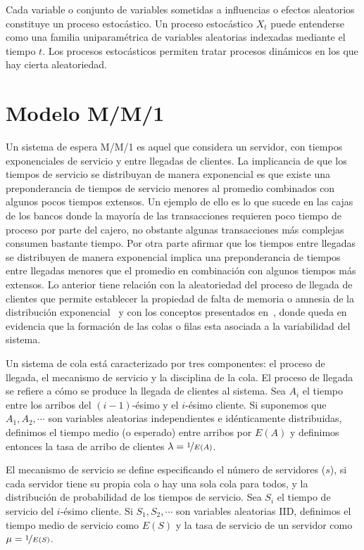 Cada variable o conjunto de variables sometidas a influencias o efectos aleatorios constituye un proceso estocástico.
Un proceso estocástico $X_{t}$ puede entenderse como una familia uniparamétrica de
variables aleatorias indexadas mediante el tiempo $t$.
Los procesos estocásticos permiten tratar procesos dinámicos en los que hay cierta aleatoriedad.


\section{Modelo M/M/1}\label{sec:modelo-m/m/1}
Un sistema de espera M/M/1 es aquel que considera un servidor, con tiempos exponenciales de servicio y entre llegadas
de clientes. La implicancia de que los tiempos de servicio se distribuyan de manera exponencial es que existe una preponderancia de
tiempos de servicio menores al promedio combinados con algunos pocos tiempos extensos. Un ejemplo de ello es lo que
sucede en las cajas de los bancos donde la mayoría de las transacciones requieren poco tiempo de proceso por parte del
cajero, no obstante algunas transacciones más complejas consumen bastante tiempo. Por otra parte afirmar que los tiempos
entre llegadas se distribuyen de manera exponencial implica una preponderancia de tiempos entre llegadas menores que el promedio
en combinación con algunos tiempos más extensos. Lo anterior tiene relación con la aleatoriedad del proceso de llegada
de clientes que permite establecer la propiedad de falta de memoria o amnesia de la distribución exponencial~\cite{operaciones2015amnesia} y
con los conceptos presentados en~\cite{operaciones2015lineas}, donde queda en evidencia
que la formación de las colas o filas esta asociada a la variabilidad del sistema.

Un sistema de cola está caracterizado por tres componentes: el proceso de llegada, el mecanismo de servicio y la disciplina de la cola. El proceso de llegada se refiere a cómo se produce la llegada de clientes al sistema. Sea $A_{i}$ el tiempo entre los arribos del $(i - 1 )$-ésimo y el $i$-ésimo cliente. Si suponemos que $A_{1},A_{2},\cdots$ son variables aleatorias independientes e idénticamente distribuidas, definimos el tiempo medio (o esperado) entre arribos por $E(A)$ y definimos entonces la tasa de arribo de clientes $\lambda=\nicefrac{1}{E(A)}$.

El mecanismo de servicio se define especificando el número de servidores ($s$), si cada servidor tiene su propia cola o hay una sola cola para todos, y la distribución de probabilidad de los tiempos de servicio. Sea $S_{i}$ el tiempo de servicio del $i$-ésimo cliente. Si $S_{1},S_{2},\cdots$ son variables aleatorias IID, definimos el tiempo medio de servicio como $E(S)$ y la tasa de servicio de un servidor como $\mu = \nicefrac{1}{E(S)}$.

